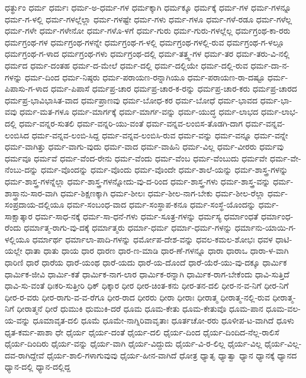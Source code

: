 ಧರ್ತ್ಥುಂ
ಧರ್ಮ
ಧರ್ಮಃ
ಧರ್ಮ-ಅ-ಧರ್ಮ-ಗಳ
ಧರ್ಮಕ್ಕಾಗಿ
ಧರ್ಮಕ್ಕೂ
ಧರ್ಮಕ್ಕೆ
ಧರ್ಮ-ಗಳ
ಧರ್ಮ-ಗಳನ್ನೂ
ಧರ್ಮ-ಗ-ಳಲ್ಲಿ
ಧರ್ಮ-ಗಳಲ್ಲೆಲ್ಲಾ
ಧರ್ಮ-ಗಳಷ್ಟೇ
ಧರ್ಮ-ಗಳು
ಧರ್ಮ-ಗಳೂ
ಧರ್ಮ-ಗಳೆ-ರಡೂ
ಧರ್ಮ-ಗಳೆಲ್ಲ
ಧರ್ಮ-ಗಳೇ
ಧರ್ಮ-ಗಳೇನೋ
ಧರ್ಮ-ಗಳೊ-ಳಗೆ
ಧರ್ಮ-ಗುರು
ಧರ್ಮ-ಗುರು-ಗಳಲ್ಲೆಲ್ಲ
ಧರ್ಮಗ್ರಂಥ-ಕಾ-ರರು
ಧರ್ಮಗ್ರಂಥ-ಗಳ
ಧರ್ಮಗ್ರಂಥ-ಗಳನ್ನೇ
ಧರ್ಮಗ್ರಂಥ-ಗ-ಳಲ್ಲಿ
ಧರ್ಮಗ್ರಂಥ-ಗಳಲ್ಲಿ-ರುವ
ಧರ್ಮಗ್ರಂಥ-ಗ-ಳಲ್ಲೂ
ಧರ್ಮಗ್ರಂಥ-ಗ-ಳಾದ
ಧರ್ಮಗ್ರಂಥ-ಗಳು
ಧರ್ಮಗ್ರಂಥ-ದಲ್ಲಿ
ಧರ್ಮ-ತತ್ತ್ವ-ಗಳ
ಧರ್ಮ-ತರ
ಧರ್ಮ-ತರು-ವಿ-ನಲ್ಲಿ
ಧರ್ಮದ
ಧರ್ಮ-ದಂತಹ
ಧರ್ಮ-ದ-ಮೇಲೆ
ಧರ್ಮ-ದಲ್ಲಿ
ಧರ್ಮ-ದಲ್ಲಿಯೇ
ಧರ್ಮ-ದಲ್ಲಿ-ರುವ
ಧರ್ಮ-ದಾ-ನ-ಗಳನ್ನು
ಧರ್ಮ-ದಿಂದ
ಧರ್ಮ-ನಿಷ್ಠರು
ಧರ್ಮ-ಪರಾಯಣ-ರನ್ನಾಗಿಯೂ
ಧರ್ಮ-ಪರಾಯಣ-ರಾ-ದಷ್ಟೂ
ಧರ್ಮ-ಪಿಪಾಸು-ಗ-ಳಾದ
ಧರ್ಮ-ಪಿಪಾಸೆ
ಧರ್ಮಪ್ರ-ಚಾರ
ಧರ್ಮಪ್ರ-ಚಾರ-ಕ-ರನ್ನು
ಧರ್ಮಪ್ರ-ಚಾರ-ಕರು
ಧರ್ಮಪ್ರ-ಚಾರದ
ಧರ್ಮಪ್ರ-ಭಾವಿಭಾಸಿತ-ವಾದ
ಧರ್ಮಪ್ರಾಣವು
ಧರ್ಮ-ಬೋಧ-ಕರ
ಧರ್ಮ-ಬೋಧೆ
ಧರ್ಮ-ಭಾವದ
ಧರ್ಮ-ಭಾ-ವವು
ಧರ್ಮ-ಮತ-ಗಳೂ
ಧರ್ಮ-ಮಾರ್ಗಕ್ಕೆ
ಧರ್ಮ-ಮಾರ್ಗ-ವನ್ನು
ಧರ್ಮ-ಯುದ್ಧ
ಧರ್ಮ-ಲಾಭದ
ಧರ್ಮ-ಲಾಭ-ದಲ್ಲಿ
ಧರ್ಮ-ವನ್ನರ-ಸುತಲಿ
ಧರ್ಮ-ವನ್ನರಿ-ಯು-ವಂತೆ
ಧರ್ಮ-ವನ್ನವ-ಲಂಬಿಸ-ತೊಡಗಿ-ದಾಗ
ಧರ್ಮ-ವನ್ನವ-ಲಂಬಿಸಿದ
ಧರ್ಮ-ವನ್ನವ-ಲಂಬಿ-ಸಿದ್ದ
ಧರ್ಮ-ವನ್ನವ-ಲಂಬಿಸಿ-ರುವ
ಧರ್ಮ-ವನ್ನು
ಧರ್ಮ-ವನ್ನೂ
ಧರ್ಮ-ವನ್ನೇ
ಧರ್ಮ-ವಾಗಿತ್ತು
ಧರ್ಮ-ವಾಗು-ವುದು
ಧರ್ಮ-ವಾದ
ಧರ್ಮ-ವಾಹಿನಿ
ಧರ್ಮ-ವಿಲ್ಲ
ಧರ್ಮ-ವೀರರು
ಧರ್ಮವು
ಧರ್ಮವೂ
ಧರ್ಮವೆ
ಧರ್ಮ-ವೆಂದ-ರೇನು
ಧರ್ಮ-ವೆಂದು
ಧರ್ಮ-ವೆಂಬ
ಧರ್ಮ-ವೆಂಬುದು
ಧರ್ಮವೇ
ಧರ್ಮ-ವೇ-ನೆಂಬು-ದನ್ನು
ಧರ್ಮ-ವೊಂದನ್ನು
ಧರ್ಮ-ವೊಂದು
ಧರ್ಮ-ವೊಂದೇ
ಧರ್ಮ-ಶಾಲೆ-ಯನ್ನು
ಧರ್ಮ-ಶಾಸ್ತ್ರ-ಗಳನ್ನು
ಧರ್ಮ-ಶಾಸ್ತ್ರ-ಗಳನ್ನೆಲ್ಲಾ
ಧರ್ಮ-ಶಾಸ್ತ್ರ-ಗಳನ್ನೋದು-ವು-ದ-ರಿಂದ
ಧರ್ಮ-ಶಾಸ್ತ್ರ-ಗಳು
ಧರ್ಮ-ಶಾಸ್ತ್ರ-ವನ್ನು
ಧರ್ಮ-ಶಾಸ್ತ್ರಾನು-ಸಾರ-ವಾಗಿ
ಧರ್ಮ-ಶಿಕ್ಷಣಕ್ಕಾಗಿ
ಧರ್ಮ-ಶೀಲಃ
ಧರ್ಮ-ಶೀಲ-ನಾಗ-ಬೇಕು
ಧರ್ಮ-ಶೀಲ-ರೆಲ್ಲಾ
ಧರ್ಮ-ಸಂಪ್ರದಾಯ-ದಲ್ಲಿಯೂ
ಧರ್ಮ-ಸಂಬಂಧ-ವಾದ
ಧರ್ಮ-ಸಂಸ್ಥಾಪ-ಕನೂ
ಧರ್ಮ-ಸಂಸ್ಥೆ-ಯೊಂದನ್ನು
ಧರ್ಮ-ಸಾಕ್ಷಾತ್ಕಾರ
ಧರ್ಮ-ಸಾಧ-ನಕ್ಕೆ
ಧರ್ಮ-ಸಾ-ಧನೆ-ಗಳು
ಧರ್ಮ-ಸೂತ್ರ-ಗಳನ್ನು
ಧರ್ಮಸ್ಯ
ಧರ್ಮಾಂಧತೆ
ಧರ್ಮಾಂಧ-ರೆಂದು
ಧರ್ಮಾತ್ಮ-ರಾಗು-ವು-ದಕ್ಕೆ
ಧರ್ಮಾತ್ಮರು
ಧರ್ಮಾ-ಧರ್ಮ
ಧರ್ಮಾ-ಧರ್ಮ-ಗಳನ್ನು
ಧರ್ಮಾನು-ಯಾಯಿ-ಗ-ಳಲ್ಲಿಯೂ
ಧರ್ಮಾರ್ಥ
ಧರ್ಮಾಲಾ-ಪಾದಿ-ಗಳನ್ನು
ಧರ್ಮೋಪ-ದೇಶ-ವನ್ನು
ಧವಲ-ಕಮಲ-ಶೋಭಃ
ಧವಳ
ಧಾಟಿ-ಯಲ್ಲೇ
ಧಾತಾ
ಧಾತು
ಧಾಯ
ಧಾರ
ಧಾರಣ
ಧಾರ-ಣ-ಮಾಡಿ
ಧಾರ-ಣೆ-ಗಳನ್ನೂ
ಧಾರಾ
ಧಾರಾಒ
ಧಾರಾ-ಳ-ವಾಗಿ
ಧಾರಿಣಿ
ಧಾರೆ
ಧಾರೆಯ
ಧಾರೆ-ಯಂಥ
ಧಾರೆ-ಯದು
ಧಾರೆ-ಯ-ದೊಂದೆ
ಧಾರೆ-ಯೆರೆ-ಯು-ವು-ದಕ್ಕೂ
ಧಾರ್ಮಿಕ
ಧಾರ್ಮಿಕ-ಜೀವಿ
ಧಾರ್ಮಿ-ಕತೆ
ಧಾರ್ಮಿಕ-ನಾಗ-ಲಾರ
ಧಾರ್ಮಿಕ-ರನ್ನಾಗಿ
ಧಾರ್ಮಿಕ-ರಾಗ-ಬೇಕೆಂದು
ಧಾವಿ-ಸುತ್ತಿದೆ
ಧಾವಿ-ಸು-ವಂತೆ
ಧಿಃಕರಿ-ಸುತ್ತೀರಿ
ಧಿಕ್
ಧಿಕ್ಕಾರ
ಧೀರ
ಧೀರ-ಚಿಂತ-ಕನು
ಧೀರ-ತನ-ದಲಿ
ಧೀರ-ನ-ವ-ನಿಗೆ
ಧೀರ-ನಿಗೆ
ಧೀರ-ರ-ವರು
ಧೀರ-ರಾಗು-ವ-ವ-ರೆಗೂ
ಧೀರ-ರಾದ
ಧೀರರು
ಧೀರಾ
ಧೀರಾಃ
ಧೀರಾತ್ಮ
ಧೀರಾತ್ಮ-ನಲ್ಲಿ-ರುವ
ಧೀರಾತ್ಮ-ನಿಗೆ
ಧೀರಾತ್ಮನೆ
ಧೀರೆ
ಧುಮುಕಿ
ಧುಮುಕಿ-ದರೆ
ಧೂಮ
ಧೂಮ-ಕೇತು
ಧೂಮ-ಕೇತುವೊ
ಧೂಮ-ಪಾನ
ಧೂಮ-ವಲ-ಯ-ವನ್ನು
ಧೂಮಾವೃತ-ದಲಿ
ಧೂಮೆ
ಧೂಮೇ-ನಾಗ್ನಿರಿವಾವೃತಾಃ
ಧೂರ್ತಚೋ-ರರು
ಧೂಳೀಪ-ಟ-ವಾಗಿದೆ
ಧೂಳು
ಧೃತ-ಕರ್ಮ-ಪಾಶಾ
ಧೇ
ಧೈರ್ಯ
ಧೈರ್ಯ-ದಂತೆ
ಧೈರ್ಯ-ದಲಿ
ಧೈರ್ಯ-ದಿಂದ
ಧೈರ್ಯ-ದಿಂದಿದ-ನೆಲ್ಲ-ರಾಲಿಸೆ
ಧೈರ್ಯ-ದಿಂದಿರು
ಧೈರ್ಯ-ವನ್ನು
ಧೈರ್ಯ-ವಾಗಿ
ಧೈರ್ಯ-ವಿದ್ದುದು
ಧೈರ್ಯ-ವಿ-ರ-ಲಿಲ್ಲ
ಧೈರ್ಯ-ವಿಲ್ಲ
ಧೈರ್ಯ-ವಿಲ್ಲ-ದವ-ರಾಗಿದ್ದೇವೆ
ಧೈರ್ಯ-ಶಾಲಿ-ಗಳಾಗುವುವು
ಧೈರ್ಯ-ಹೀನ-ವಾಗಿದೆ
ಧೋತ್ರ
ಧ್ಯಾತೃ
ಧ್ಯಾತ್ವಾ
ಧ್ಯಾನ
ಧ್ಯಾನಕ್ಕೆ
ಧ್ಯಾನದ
ಧ್ಯಾನ-ದಲ್ಲಿ
ಧ್ಯಾನ-ದಲ್ಲಿದ್ದ
